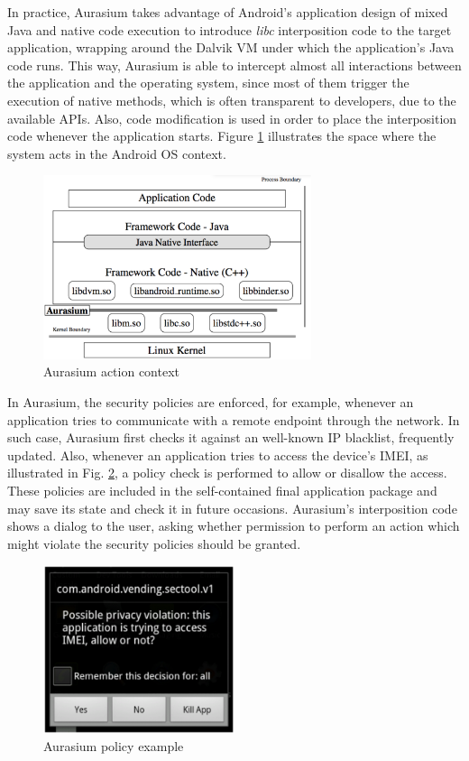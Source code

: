 In practice, Aurasium takes advantage of Android's application design of mixed Java and native code execution to introduce \textit{libc} interposition code to the target application, wrapping around the Dalvik VM under which the application's Java code runs. This way, Aurasium is able to intercept almost all interactions between the application and the operating system, since most of them trigger the execution of native methods, which is often transparent to developers, due to the available APIs. Also, code modification is used in order to place the interposition code whenever the application starts. Figure \ref{fig:aurasium-arch} illustrates the space where the system acts in the Android OS context.

\begin{figure}[t!]
\includegraphics[width=0.7\textwidth]{figs/aurasium-arch}
\centering
\caption{Aurasium action context}
\label{fig:aurasium-arch}
\end{figure}

In Aurasium, the security policies are enforced, for example, whenever an application tries to communicate with a remote endpoint through the network. In such case, Aurasium first checks it against an well-known IP blacklist, frequently updated. Also, whenever an application
tries to access the device's IMEI, as illustrated in Fig.  \ref{fig:aurasium-policy}, a policy check is performed to allow or disallow the access. These policies are included in the self-contained final application package and may save its state and check it in future occasions. Aurasium's interposition code shows a dialog to the user, asking whether permission to perform an action which might violate the security policies should be granted.

\begin{figure}[t!]
\includegraphics[width=0.5\textwidth]{figs/aurasium-policy}
\centering
\caption{Aurasium policy example}
\label{fig:aurasium-policy}
\end{figure}

